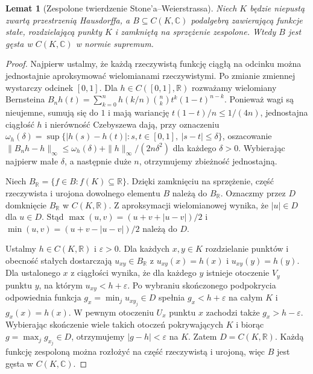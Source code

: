 \documentclass[11pt,a4paper]{article}
\numberwithin{equation}{section}
\theoremstyle{plain}
\newtheorem{lemat}[twierdzenie]{Lemat}
\theoremstyle{definition}
\theoremstyle{remark}
\newcommand{\R}{\mathbb R}
\newcommand{\C}{\mathbb C}
\begin{document}
\begin{lemat}[Zespolone twierdzenie Stone'a--Weierstrassa]
\label{lem:stone-weierstrass31}
Niech $K$ będzie niepustą zwartą przestrzenią Hausdorffa, a
$B\subseteq C(K,\C)$ podalgebrą zawierającą funkcje stałe,
rozdzielającą punkty $K$ i zamkniętą na sprzężenie zespolone.
Wtedy $B$ jest gęsta w $C(K,\C)$ w normie supremum.
\end{lemat}
\begin{proof}
Najpierw ustalmy, że każdą rzeczywistą funkcję ciągłą na odcinku
można jednostajnie aproksymować wielomianami rzeczywistymi.
Po zmianie zmiennej wystarczy odcinek $[0,1]$. Dla $h\in C([0,1],\R)$
rozważamy wielomiany Bernsteina
$B_nh(t)=\sum_{k=0}^nh(k/n)\binom nk t^k(1-t)^{n-k}$.
Ponieważ wagi są nieujemne, sumują się do $1$ i mają wariancję
$t(1-t)/n\le1/(4n)$, jednostajna ciągłość $h$ i nierówność
Czebyszewa dają, przy oznaczeniu
$\omega_h(\delta)=\sup\{|h(s)-h(t)|:s,t\in[0,1],\ |s-t|\le\delta\}$,
oszacowanie
$\|B_nh-h\|_\infty\le\omega_h(\delta)
+\|h\|_\infty/(2n\delta^2)$ dla każdego $\delta>0$.
Wybierając najpierw małe $\delta$, a następnie duże $n$,
otrzymujemy zbieżność jednostajną.

Niech $B_\R=\{f\in B:f(K)\subseteq\R\}$.
Dzięki zamknięciu na sprzężenie, część rzeczywista i urojona
dowolnego elementu $B$ należą do $B_\R$.
Oznaczmy przez $D$ domknięcie $B_\R$ w $C(K,\R)$.
Z aproksymacji wielomianowej wynika, że $|u|\in D$ dla $u\in D$.
Stąd $\max(u,v)=(u+v+|u-v|)/2$ i
$\min(u,v)=(u+v-|u-v|)/2$ należą do $D$.

Ustalmy $h\in C(K,\R)$ i $\varepsilon>0$.
Dla każdych $x,y\in K$ rozdzielanie punktów i obecność stałych
dostarczają $u_{xy}\in B_\R$ z
$u_{xy}(x)=h(x)$ i $u_{xy}(y)=h(y)$.
Dla ustalonego $x$ z ciągłości wynika, że dla każdego $y$
istnieje otoczenie $V_y$ punktu $y$, na którym
$u_{xy}<h+\varepsilon$. Po wybraniu skończonego podpokrycia
odpowiednia funkcja $g_x=\min_j u_{xy_j}\in D$ spełnia
$g_x<h+\varepsilon$ na całym $K$ i $g_x(x)=h(x)$.
W pewnym otoczeniu $U_x$ punktu $x$ zachodzi także
$g_x>h-\varepsilon$. Wybierając skończenie wiele takich
otoczeń pokrywających $K$ i biorąc $g=\max_j g_{x_j}\in D$,
otrzymujemy $|g-h|<\varepsilon$ na $K$.
Zatem $D=C(K,\R)$. Każdą funkcję zespoloną można rozłożyć
na część rzeczywistą i urojoną, więc $B$ jest gęsta w $C(K,\C)$.
\end{proof}
\end{document}

